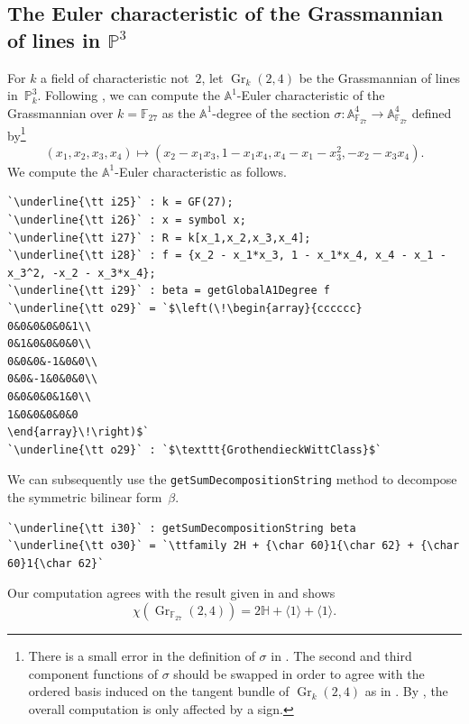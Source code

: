 \documentclass[12pt]{amsart}
\theoremstyle{definition}
\DeclareMathOperator{\Gr}{Gr}
\begin{document}
\subsection{The Euler characteristic of the Grassmannian of lines in \texorpdfstring{$\mathbb{P}^{3}$}{P\textthreesuperior}}\label{subsec: Grassmannian} 
For $k$ a field of characteristic not~$2$, let $\Gr_{k}(2,4)$ be the Grassmannian of lines in~$\mathbb{P}^{3}_{k}$. Following \cite[Example~8.2]{BMP}, we can compute the $\mathbb{A}^{1}$-Euler characteristic of the Grassmannian over $k=\mathbb{F}_{27}$ as the $\mathbb{A}^{1}$-degree of the section $\sigma\colon\mathbb{A}^{4}_{\mathbb{F}_{27}}\to\mathbb{A}^{4}_{\mathbb{F}_{27}}$ defined by\footnote{%
There is a small error in the definition of $\sigma$ in \cite[Example~8.2]{BMP}. The second and third component functions of $\sigma$ should be swapped in order to agree with the ordered basis induced on the tangent bundle of $\Gr_k(2,4)$ as in \cite[Proposition~45]{CubicKW}. By \cite[Example~6.3]{BMP}, the overall computation is only affected by a sign.
}
\[
(x_1,x_2,x_3,x_4)\mapsto(
x_{2}-x_{1}x_{3},
1-x_{1}x_{4},
x_{4}-x_{1}-x_{3}^{2},
-x_{2}-x_{3}x_{4}).
\]
We compute the $\mathbb{A}^{1}$-Euler characteristic as follows.

\begin{lstlisting}[language=Macaulay2output]
`\underline{\tt i25}` : k = GF(27);
`\underline{\tt i26}` : x = symbol x;
`\underline{\tt i27}` : R = k[x_1,x_2,x_3,x_4];
`\underline{\tt i28}` : f = {x_2 - x_1*x_3, 1 - x_1*x_4, x_4 - x_1 - x_3^2, -x_2 - x_3*x_4};
`\underline{\tt i29}` : beta = getGlobalA1Degree f
`\underline{\tt o29}` = `$\left(\!\begin{array}{cccccc}
0&0&0&0&0&1\\
0&1&0&0&0&0\\
0&0&0&-1&0&0\\
0&0&-1&0&0&0\\
0&0&0&0&1&0\\
1&0&0&0&0&0
\end{array}\!\right)$`
`\underline{\tt o29}` : `$\texttt{GrothendieckWittClass}$`
\end{lstlisting}
We can subsequently use the \texttt{getSumDecompositionString} method to decompose the symmetric bilinear form~$\beta$.

\begin{lstlisting}[language=Macaulay2output]
`\underline{\tt i30}` : getSumDecompositionString beta
`\underline{\tt o30}` = `\ttfamily 2H + {\char 60}1{\char 62} + {\char 60}1{\char 62}`
\end{lstlisting}
Our computation agrees with the result given in \cite[Example~8.2]{BMP} and shows \[\chi(\Gr_{\mathbb{F}_{27}}(2,4))=2\mathbb{H}+\langle 1\rangle + \langle 1\rangle.\]
\end{document}
